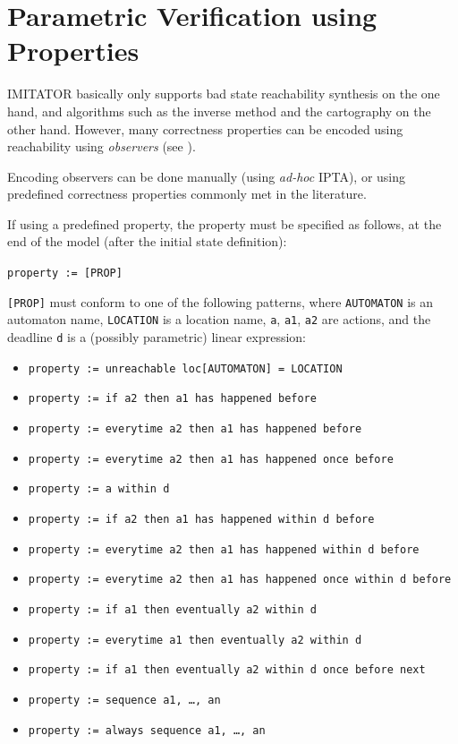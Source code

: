 \documentclass[a4paper,11pt]{report}
\makeatletter
\newcommand{\imitator}{\textsf{IMITATOR}}
\newcommand{\IPTA}{IPTA}
\newcommand{\styleIMI}[1]{\textcolor{imicolor}{\texttt{#1}}}
\newcommand{\adhoc}{\textcolor{colorok}{\textit{ad-hoc}\@}}
\makeatother
\begin{document}
\section{Parametric Verification using Properties}\label{ss:mode:prop}

\imitator{} basically only supports bad state reachability synthesis on the one hand, and algorithms such as the inverse method and the cartography on the other hand.
However, many correctness properties can be encoded using reachability using \emph{observers} (see \cite{ABL98,ABBL98,Andre13ICECCS}).

Encoding observers can be done manually (using \adhoc{} \IPTA{}), or using predefined correctness properties commonly met in the literature.

If using a predefined property, the property must be specified as follows, at the end of the model (after the initial state definition):

\styleIMI{property := [PROP]}

\styleIMI{[PROP]} must conform to one of the following patterns, where \styleIMI{AUTOMATON} is an automaton name, \styleIMI{LOCATION} is a location name, \styleIMI{a}, \styleIMI{a1}, \styleIMI{a2} are actions, and the deadline \styleIMI{d} is a (possibly parametric) linear expression:

\begin{itemize}
	\item \styleIMI{property := unreachable loc[AUTOMATON] = LOCATION}
	\item \styleIMI{property := if a2 then a1 has happened before}
	\item \styleIMI{property := everytime a2 then a1 has happened before}
	\item \styleIMI{property := everytime a2 then a1 has happened once before}
	\item \styleIMI{property := a within d}
	\item \styleIMI{property := if a2 then a1 has happened within d before}
	\item \styleIMI{property := everytime a2 then a1 has happened within d before}
	\item \styleIMI{property := everytime a2 then a1 has happened once within d before}
	\item \styleIMI{property := if a1 then eventually a2 within d}
	\item \styleIMI{property := everytime a1 then eventually a2 within~d}
	\item \styleIMI{property := if a1 then eventually a2 within d once before next}
	\item \styleIMI{property := sequence a1, \dots, an}
	\item \styleIMI{property := always sequence a1, \dots, an}
\end{itemize}
\end{document}
